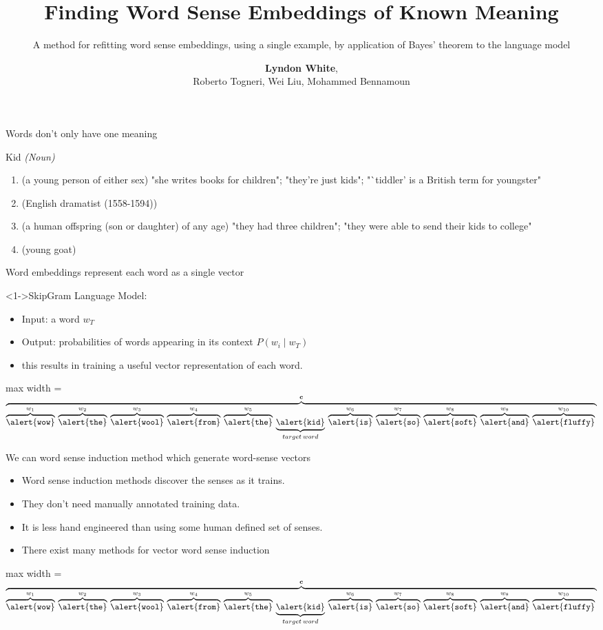 \documentclass[dvipsnames]{beamer}
\author{\textbf{Lyndon White},\\ Roberto Togneri, Wei Liu, Mohammed Bennamoun}
\institute{School of Electical, Electronic and Computer Engineering\\The University of Western Australia}
\title{Finding Word Sense Embeddings of Known Meaning}
\subtitle{A method for refitting word sense embeddings,  using a single example, by application of Bayes' theorem to the language model}
\date{}
\newcommand{\fitmath}[1]{
	\begin{adjustbox}{max width = \textwidth}	
		$\displaystyle
		#1
		$
	\end{adjustbox}
}
\renewcommand{\c}{\mathbf{c}}
\newcommand{\ubraceword}[2]{\underbrace{\mathtt{\alert{#1}}}_{#2}\:}
\newcommand{\obraceword}[2]{\overbrace{\mathtt{\alert{#1}}}^{#2}\:}
\begin{document}
	
\newcommand{\sentexample}{\vfill\fitmath{
		\overbrace{
			\obraceword{wow}{w_1}
			\obraceword{the} {w_2}
			\obraceword{wool} {w_3}
			\obraceword{from} {w_4}
			\obraceword{the} {w_5}
			\ubraceword{kid} {target\: word}
			\obraceword{is} {w_6}
			\obraceword{so}{w_7}
			\obraceword{soft}{w_8}
			\obraceword{and} {w_9}
			\obraceword{fluffy}{w_{10}}
		}^{\c}
	}}
	

\frame{\maketitle}

\newcommand{\glosses}{
	\alert{Kid \emph{(Noun)}}
	\begin{enumerate}
		\item (a young person of either sex) "she writes books for children"; "they're just kids"; "`tiddler' is a British term for youngster"
		\item (English dramatist (1558-1594)) 
		\item (a human offspring (son or daughter) of any age) "they had three children"; "they were able to send their kids to college"
		\item (young goat) 
	\end{enumerate}
}


\begin{frame}{Words don't only have one meaning}
	\vspace{1em}
	\glosses
\end{frame}

\begin{frame}{Word embeddings represent each word as a single vector}
	\begin{block}<1->{SkipGram Language Model:}
		\begin{itemize}
			\item \alert{Input:} a word $w_T$
			\item \alert{Output:} probabilities of words appearing in its context
			 \alert{$P(w_i \mid w_T)$}
			\item this results in training a useful \alert{vector representation} of each word.
		\end{itemize}
	\end{block}
	
	\sentexample
\end{frame}


\begin{frame}{We can word sense induction method which generate word-sense vectors}
	\begin{itemize}
		\item Word sense induction methods discover the senses as it trains.
		\item They don't need manually \alert{annotated} training data.
		\item It is less \alert{hand engineered} than using some human defined set of senses.
		\item There exist many methods for vector word sense induction
	\end{itemize}
	\sentexample
\end{frame}
\end{document}

